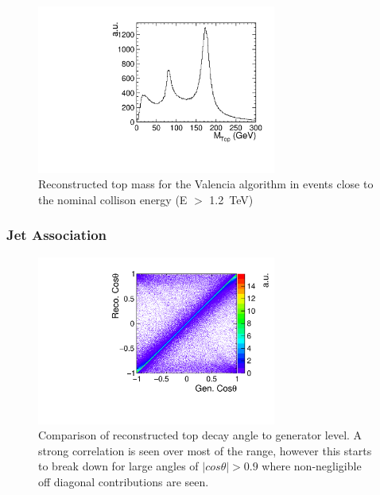 \begin{figure}
  \centering
  \includegraphics[width=0.7\textwidth]{TopAnalysis/figures/TopMass_EOver1200.pdf}
  \caption[Performance of Valencia algorithm for high energy events]{Reconstructed top mass for the Valencia algorithm in events close to the nominal collison energy (E $>$ 1.2~TeV)}
  \label{fig:highEValencia}
\end{figure}


\subsubsection{Jet Association}
\label{sec:jetassociation}
\begin{figure}
  \centering
  \includegraphics[width=0.7\textwidth]{TopAnalysis/figures/CosThetaRecoVsMC.pdf}
  \caption[Comparison of reconstructed top decay angle to generator level]{Comparison of reconstructed top decay angle to generator level. A strong correlation is seen over most of the range, however this starts to break down for large angles of $\mid cos\theta \mid>0.9$ where non-negligible off diagonal contributions are seen.}
  \label{fig:2djetangle}
\end{figure}

